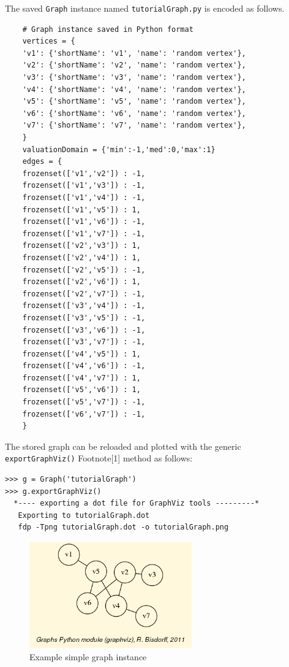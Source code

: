 The saved \texttt{Graph} instance named \texttt{tutorialGraph.py} is encoded as follows.
\begin{lstlisting}
    # Graph instance saved in Python format
    vertices = {
    'v1': {'shortName': 'v1', 'name': 'random vertex'},
    'v2': {'shortName': 'v2', 'name': 'random vertex'},
    'v3': {'shortName': 'v3', 'name': 'random vertex'},
    'v4': {'shortName': 'v4', 'name': 'random vertex'},
    'v5': {'shortName': 'v5', 'name': 'random vertex'},
    'v6': {'shortName': 'v6', 'name': 'random vertex'},
    'v7': {'shortName': 'v7', 'name': 'random vertex'},
    }
    valuationDomain = {'min':-1,'med':0,'max':1}
    edges = {
    frozenset(['v1','v2']) : -1, 
    frozenset(['v1','v3']) : -1, 
    frozenset(['v1','v4']) : -1, 
    frozenset(['v1','v5']) : 1, 
    frozenset(['v1','v6']) : -1, 
    frozenset(['v1','v7']) : -1, 
    frozenset(['v2','v3']) : 1, 
    frozenset(['v2','v4']) : 1, 
    frozenset(['v2','v5']) : -1, 
    frozenset(['v2','v6']) : 1, 
    frozenset(['v2','v7']) : -1, 
    frozenset(['v3','v4']) : -1, 
    frozenset(['v3','v5']) : -1, 
    frozenset(['v3','v6']) : -1, 
    frozenset(['v3','v7']) : -1, 
    frozenset(['v4','v5']) : 1, 
    frozenset(['v4','v6']) : -1, 
    frozenset(['v4','v7']) : 1, 
    frozenset(['v5','v6']) : 1, 
    frozenset(['v5','v7']) : -1, 
    frozenset(['v6','v7']) : -1, 
    }
\end{lstlisting}

The stored graph can be reloaded and plotted with the generic \\
\texttt{exportGraphViz()} Footnote[1] method as follows:
\begin{lstlisting}
>>> g = Graph('tutorialGraph')
>>> g.exportGraphViz()
  *---- exporting a dot file for GraphViz tools ---------*
   Exporting to tutorialGraph.dot
   fdp -Tpng tutorialGraph.dot -o tutorialGraph.png
\end{lstlisting}
\begin{figure}[h]
\sidecaption
\includegraphics[width=7cm]{Figures/tutorialGraph.png}
\caption{Example simple graph instance} 
\label{fig:22.1}       %
\end{figure}

